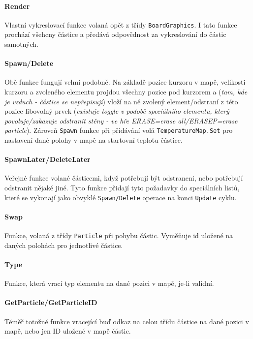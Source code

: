\documentclass[a4paper, 12pt]{article}
\begin{document}
\paragraph{Render}
Vlastní vykreslovací funkce volaná opět z třídy \texttt{BoardGraphics}. I tato
funkce prochází všehcny částice a předává odpovědnost za vykreslování do částic
samotných.

\paragraph{Spawn/Delete}
Obě funkce fungují velmi podobně. Na základě pozice kurzoru v mapě, velikosti
kurzoru a zvoleného elementu projdou všechny pozice pod kurzorem a (\emph{tam,
kde je vzduch - částice se nepřepisují}) vloží na ně zvolený element/odstraní z
této pozice libovolný prvek (\emph{existuje toggle v podobě speciálního
elementu, který povoluje/zakazuje odstranit stěny - ve hře ERASE=erase
all/ERASEP=erase particle}). Zároveň \texttt{Spawn} funkce při přidávání volá
\texttt{TemperatureMap.Set} pro nastavení dané polohy v mapě na startovní
teplotu částice.

\paragraph{SpawnLater/DeleteLater}
Veřejné funkce volané částicemi, když potřebují být odstraneni, nebo potřebují
odstranit nějaké jiné. Tyto funkce přidají tyto požadavky do speciálních listů,
které se vykonají jako obvyklé \texttt{Spawn/Delete} operace na konci 
\texttt{Update} cyklu.

\paragraph{Swap}
Funkce, volaná z třídy \texttt{Particle} při pohybu částic. Vyměňuje id uložené
na daných polohách pro jednotlivé částice.

\paragraph{Type}
Funkce, která vrací typ elementu na dané pozici v mapě, je-li validní.

\paragraph{GetParticle/GetParticleID}
Téměř totožné funkce vracející buď odkaz na celou třídu částice na dané pozici
v mapě, nebo jen ID uložené v mapě částic.
\end{document}
